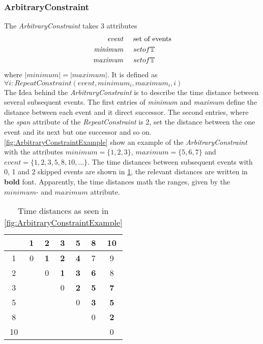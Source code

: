 	\subsubsection{ArbitraryConstraint}
		The \emph{ArbitraryConstraint} takes 3 attributes
		\begin{align*}
			\emph{event} 	& \hspace{.5cm}\text{set of events}\\
			\emph{minimum}	& \hspace{.5cm} set of \mathbb{T}\\
			\emph{maximum}	& \hspace{.5cm} set of \mathbb{T}
		\end{align*}
		where $|minimum|=|maximum|$. It is defined as \\[10pt]
		\begin{math}
			\forall i: RepeatConstraint(event, minimum_i, maximum_i, i)
		\end{math}\\[10pt]
		The Idea behind the \emph{ArbitraryConstraint} is to describe the time distance between several subsequent events. The first entries of \emph{minimum} and \emph{maximum} define the distance between each event and it direct successor. The second entries, where the \emph{span} attribute of the  \emph{RepeatConstraint} is 2, set the distance between the one event and its next but one successor and so on.\\
		\ref{fig:ArbitraryConstraintExample} show an example of the \emph{ArbitraryConstraint} with the attributes $minimum=\{1,2,3\}$, $maximum=\{5,6,7\}$ and $event=\{1, 2, 3, 5, 8, 10, ...\}$. The time distances between subsequent events with 0, 1 and 2 skipped events are shown in \ref{fig:ArbitraryConstraintExampleTable}, the relevant distances are written in \textbf{bold} font. Apparently, the time distances math the ranges, given by the $minimum$- and $maximum$ attribute.\\
		\begin{table}
			\begin{tabular}{|c|c|c|c|c|c|c|}
				\hline
				& 1 & 2 & 3 & 5 & 8 & 10 \\
				\hline
				1 & 0 & \textbf{1} & \textbf{2} & \textbf{4} & 7 & 9 \\
				\hline
				2 &  & 0 & \textbf{1} & \textbf{3} & \textbf{6} & 8 \\
				\hline
				3 &  &  & 0 & \textbf{2} & \textbf{5} & \textbf{7} \\
				\hline
				5 &  &  &  & 0 & \textbf{3} & \textbf{5} \\
				\hline
				8 &  &  &  &  & 0 & \textbf{2} \\
				\hline
				10 &  &  &  &  &  & 0 \\
				\hline
			\end{tabular}
			\centering
			\caption{Time distances as seen in \ref{fig:ArbitraryConstraintExample}}
			\label{fig:ArbitraryConstraintExampleTable}
		\end{table}


